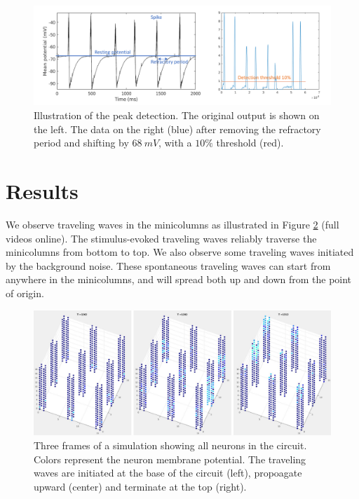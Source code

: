 \documentclass[a4paper,11pt]{article}
\begin{document}
\begin{figure}[!ht]
 \caption{Illustration of the peak detection. The original output is shown on the left. The data on the right (blue) after removing the refractory period and shifting by $68\ mV$, with a $10\%$ threshold (red). }
 \label{fig:peak_det}
 \centering
   \includegraphics[width=\textwidth]{fig/PeakDetectionExample}
\end{figure}


\clearpage
\section{Results}
We observe traveling waves in the minicolumns as illustrated in Figure \ref{fig:firing_video} (full videos online).
The stimulus-evoked traveling waves reliably traverse the minicolumns from bottom to top.
We also observe some traveling waves initiated by the background noise.
These spontaneous traveling waves can start from anywhere in the minicolumns, and will spread both up and down from the point of origin.
\begin{figure}[!ht]
 \caption{Three frames of a simulation showing all neurons in the circuit. Colors represent the neuron membrane potential. The traveling waves are initiated at the base of the circuit (left), propoagate upward (center) and terminate at the top (right).} 
 \label{fig:firing_video}
 \centering
   \includegraphics[width=\textwidth]{fig/VideoStills}
\end{figure}
\end{document}
